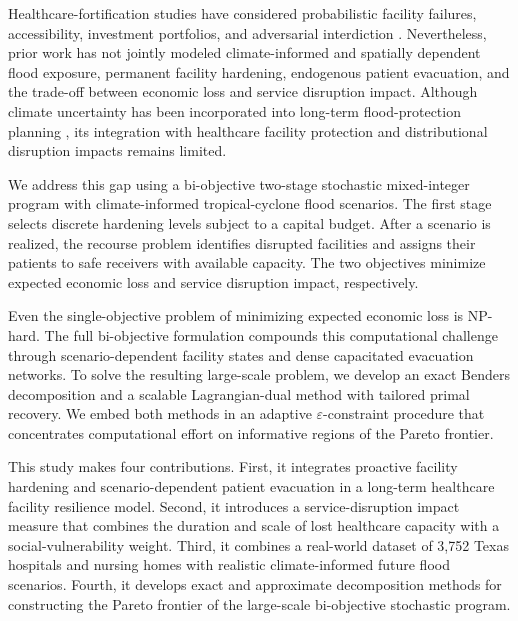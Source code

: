 \documentclass[preprint,11pt,authoryear]{elsarticle}
\begin{document}
Healthcare-fortification studies have considered probabilistic facility
failures, accessibility, investment portfolios, and adversarial interdiction
\citep{liberatore_hedging_2012,aliakbarian_bi-level_2015, toplu-tutay_scenario-based_2022, khanduzi_bilevel_2024,baret_enhancing_2025,baret_optimization_2026}. Nevertheless, prior work has not jointly modeled climate-informed and
spatially dependent flood exposure, permanent facility hardening,
endogenous patient evacuation, and the trade-off between economic loss and service disruption impact. Although climate uncertainty has been incorporated into long-term flood-protection planning
\citep{pol_optimal_2014,postek_adjustable_2019,
phouratsamay_strategic_2024}, its integration with healthcare facility
protection and distributional disruption impacts remains limited.

We address this gap using a bi-objective two-stage stochastic mixed-integer
program with climate-informed tropical-cyclone flood scenarios. The first
stage selects discrete hardening levels subject to a capital budget. After a
scenario is realized, the recourse problem identifies disrupted facilities and
assigns their patients to safe receivers with available capacity. The two
objectives minimize expected economic loss and service disruption impact, respectively.

Even the single-objective problem of minimizing expected economic loss is
NP-hard. The full bi-objective formulation compounds this computational
challenge through scenario-dependent facility states and dense capacitated
evacuation networks. To solve the resulting large-scale problem, we develop an
exact Benders decomposition and a scalable Lagrangian-dual method with tailored
primal recovery. We embed both methods in an adaptive
$\varepsilon$-constraint procedure that concentrates computational effort on
informative regions of the Pareto frontier.

This study makes four contributions. First, it integrates proactive facility
hardening and scenario-dependent patient evacuation in a long-term healthcare facility resilience model. Second, it introduces a service-disruption impact measure that combines the duration and scale of lost healthcare capacity with a social-vulnerability weight. Third, it combines a real-world dataset of 3,752 Texas hospitals and nursing homes with realistic climate-informed future flood scenarios. Fourth, it develops exact and approximate decomposition methods for constructing the Pareto frontier of the
large-scale bi-objective stochastic program.
\end{document}
